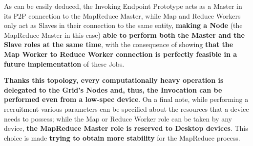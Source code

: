 As can be easily deduced, the Invoking Endpoint Prototype acts as a Master in its P2P connection to the MapReduce Master, while Map and Reduce Workers only act as Slaves in their connection to the same entity, \textbf{making a Node} (the MapReduce Master in this case) \textbf{able to perform both the Master and the Slave roles at the same time}, with the consequence of showing \textbf{that the Map Worker to Reduce Worker connection is perfectly feasible in a future implementation} of these Jobs.

\textbf{Thanks this topology, every computationally heavy operation is delegated to the Grid's Nodes and, thus, the Invocation can be performed even from a low-spec device}. On a final note, while performing a recruitment various parameters can be specified about the resources that a device needs to possess; while the Map or Reduce Worker role can be taken by any device, \textbf{the MapReduce Master role is reserved to Desktop devices}. This choice is made \textbf{trying to obtain more stability} for the MapReduce process.  